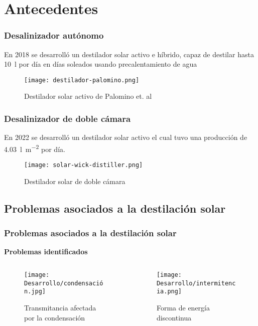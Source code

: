 \section{Antecedentes}

\begin{frame}
	\frametitle{Desalinizador autónomo}
	En 2018 se desarrolló un destilador solar activo e híbrido, capaz de destilar hasta \SI{10}{\litre} por día en días soleados usando precalentamiento de agua\\
	\begin{figure}
		\centering
		\texttt{[image: destilador-palomino.png]}
		\caption{Destilador solar activo de Palomino et. al}
		{\scriptsize{}}
	\end{figure}
\end{frame}


\begin{frame}
	\frametitle{Desalinizador de doble cámara}
	En 2022 se desarrolló un destilador solar activo el cual tuvo una producción de \qty{4.03}{\litre\per\metre\tothe{2}} por día.\\
	\begin{figure}
		\centering
		\texttt{[image: solar-wick-distiller.png]}
		\caption{Destilador solar de doble cámara}
		{\scriptsize{}}
	\end{figure}
\end{frame}

\subsection{Problemas asociados a la destilación solar}
	\begin{frame}
	    \frametitle{Problemas asociados a la destilación solar}
	    \vspace*{2mm}
	    
	    \textbf{\large Problemas identificados}\\[5mm]
	    
	    \begin{columns}
	    		\begin{column}{0.5\linewidth}
	    			\begin{figure}
	    				\texttt{[image: Desarrollo/condensación.jpg]}
	    				\caption{Transmitancia afectada por la condensación}
	    			\end{figure}
		    \end{column}
		    \begin{column}{0.5\linewidth}
		    		\begin{figure}
	    				\texttt{[image: Desarrollo/intermitencia.png]}
	    				\caption{Forma de energía discontinua}
	    			\end{figure}
		    \end{column}
	    \end{columns}
	\end{frame}